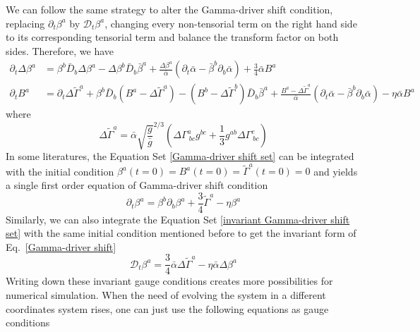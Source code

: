 \documentclass[letterpaper,nofootinbib,prd,amsmath,onecolumn]{revtex4-1}
\begin{document}
We can follow the same strategy to alter the Gamma-driver shift condition, replacing $\partial_{t}\beta^{a}$ by $\mathscr{D}_{t}\beta^{a}$, changing every non-tensorial term on the right hand side to its corresponding tensorial term and balance the transform factor on both sides. Therefore, we have
\begin{subequations}
\begin{align}\label{invariant Gamma-driver shift set}
\partial_{t}\Delta \beta^{a} & = \beta^{b}{\bar D}_{b}\Delta\beta^{a} - \Delta \beta^{b}{\bar D}_{b}{\bar \beta}^{a} + \frac{\Delta\beta^{a}}{{\bar \alpha}}(\partial_{t}{\bar \alpha} - {\bar \beta}^{b}\partial_{b}{\bar \alpha}) + \frac{3}{4}{\bar \alpha}B^{a}\\
\partial_{t}B^{a} & = \partial_{t}\Delta {\tilde \Gamma}^{a} + \beta^{b}{\bar D}_{b}(B^{a} - \Delta{\tilde \Gamma}^{a}) - (B^{b} - \Delta{\tilde \Gamma}^{b}){\bar D}_{b}{\bar \beta}^{a} + \frac{B^{a} - \Delta{\tilde \Gamma}^{a}}{{\bar \alpha}}(\partial_{t}{\bar \alpha} - {\bar \beta}^{b}\partial_{b}{\bar \alpha}) - \eta{\bar \alpha}B^{a}
\end{align}
\end{subequations}
where
\begin{equation}
\Delta {\tilde \Gamma}^{a} = {\bar \alpha}\sqrt{\frac{g}{{\bar g}}}^{2/3}\left(\Delta \Gamma^{a}_{~bc}g^{bc} + \frac{1}{3}g^{ab}\Delta \Gamma^{c}_{~bc}\right)
\end{equation}
In some literatures, the Equation Set \ref{Gamma-driver shift set} can be integrated with the initial condition $\beta^{a}(t=0) = B^{a}(t=0) = {\tilde \Gamma}^{a}(t = 0) = 0$ and yields a single first order equation of Gamma-driver shift condition
\begin{equation}\label{Gamma-driver shift}
\partial_{t}\beta^{a} = \beta^{b}\partial_{b}\beta^{a} + \frac{3}{4}{\tilde \Gamma}^{a} - \eta \beta^{a}
\end{equation} 
Similarly, we can also integrate the Equation Set \ref{invariant Gamma-driver shift set} with the same initial condition mentioned before to get the invariant form of Eq.~\ref{Gamma-driver shift}
\begin{equation}\label{invariant Gamma-driver shift}
\mathscr{D}_{t}\beta^{a} = \frac{3}{4}{\bar \alpha}\Delta {\tilde \Gamma}^{a} - \eta {\bar \alpha}\Delta\beta^{a}
\end{equation}
Writing down these invariant gauge conditions creates more possibilities for numerical simulation. When the need of evolving the system in a different coordinates system rises, one can just use the following equations as gauge conditions
\end{document}
